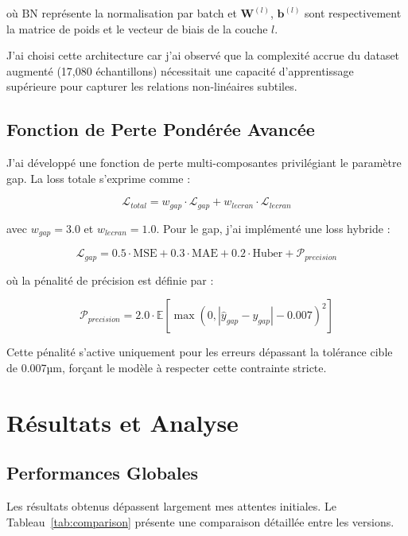 \documentclass[10pt,twocolumn]{article}
\begin{document}
où $\text{BN}$ représente la normalisation par batch et $\mathbf{W}^{(l)}$, $\mathbf{b}^{(l)}$ sont respectivement la matrice de poids et le vecteur de biais de la couche $l$.

J'ai choisi cette architecture car j'ai observé que la complexité accrue du dataset augmenté (17,080 échantillons) nécessitait une capacité d'apprentissage supérieure pour capturer les relations non-linéaires subtiles.

\subsection{Fonction de Perte Pondérée Avancée}

J'ai développé une fonction de perte multi-composantes privilégiant le paramètre gap. La loss totale s'exprime comme :

\begin{equation}
\mathcal{L}_{total} = w_{gap} \cdot \mathcal{L}_{gap} + w_{lecran} \cdot \mathcal{L}_{lecran}
\end{equation}

avec $w_{gap} = 3.0$ et $w_{lecran} = 1.0$. Pour le gap, j'ai implémenté une loss hybride :

\begin{equation}
\mathcal{L}_{gap} = 0.5 \cdot \text{MSE} + 0.3 \cdot \text{MAE} + 0.2 \cdot \text{Huber} + \mathcal{P}_{precision}
\end{equation}

où la pénalité de précision est définie par :

\begin{equation}
\mathcal{P}_{precision} = 2.0 \cdot \mathbb{E}[\max(0, |\hat{y}_{gap} - y_{gap}| - 0.007)^2]
\end{equation}

Cette pénalité s'active uniquement pour les erreurs dépassant la tolérance cible de 0.007µm, forçant le modèle à respecter cette contrainte stricte.

\section{Résultats et Analyse}

\subsection{Performances Globales}

Les résultats obtenus dépassent largement mes attentes initiales. Le Tableau~\ref{tab:comparison} présente une comparaison détaillée entre les versions.
\end{document}

